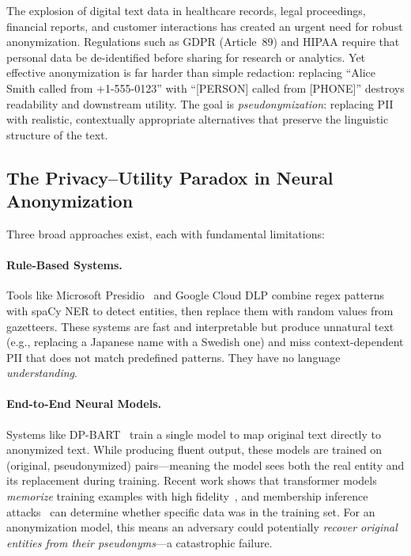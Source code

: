 \documentclass[11pt, a4paper]{article}
\begin{document}
The explosion of digital text data in healthcare records, legal
proceedings, financial reports, and customer interactions has created an
urgent need for robust anonymization.  Regulations such as GDPR
(Article~89) and HIPAA require that personal data be de-identified before
sharing for research or analytics.  Yet effective anonymization is far
harder than simple redaction: replacing ``Alice Smith called from
+1-555-0123'' with ``[PERSON] called from [PHONE]'' destroys
readability and downstream utility.  The goal is \emph{pseudonymization}:
replacing PII with realistic, contextually appropriate alternatives that
preserve the linguistic structure of the text.

\subsection{The Privacy--Utility Paradox in Neural Anonymization}

Three broad approaches exist, each with fundamental limitations:

\paragraph{Rule-Based Systems.}
Tools like Microsoft Presidio~\cite{presidio2023} and Google Cloud DLP
combine regex patterns with spaCy NER to detect entities, then replace
them with random values from gazetteers.  These systems are fast and
interpretable but produce unnatural text (e.g., replacing a Japanese
name with a Swedish one) and miss context-dependent PII that does not
match predefined patterns.  They have no language \emph{understanding}.

\paragraph{End-to-End Neural Models.}
Systems like DP-BART~\cite{igamberdiev2023dp_bart} train a single model
to map original text directly to anonymized text.  While producing
fluent output, these models are trained on (original, pseudonymized)
pairs---meaning the model sees both the real entity and its replacement
during training.  Recent work shows that transformer models
\emph{memorize} training examples with high fidelity~\cite{carlini2021extracting,
carlini2022quantifying}, and membership inference
attacks~\cite{shokri2017membership} can determine whether specific
data was in the training set.  For an anonymization model, this means
an adversary could potentially \emph{recover original entities from
their pseudonyms}---a catastrophic failure.
\end{document}
